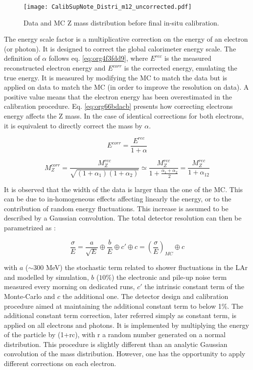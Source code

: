 \begin{figure}[htbp]
\centering
\texttt{[image: CalibSupNote\_Distri\_m12\_uncorrected.pdf]}
\caption{\label{fig:orgb935e5f}
Data and MC Z mass distribution before final in-situ calibration.}
\end{figure}


The energy scale factor is a multiplicative correction on the energy of an electron (or photon).
It is designed to correct the global calorimeter energy scale.
The definition of \(\alpha\) follows eq. \ref{eq:org4f3fdd9}, where \(E^{rec}\) is the measured reconstructed electron energy and \(E^{corr}\) is the corrected energy, emulating the true energy.
It is measured by modifying the MC to match the data but is applied on data to match the MC (in order to improve the resolution on data).
A positive value means that the electron energy has been overestimated in the calibration procedure.
Eq.  \ref{eq:org66bdacb} presents how correcting electrons energy affects the Z mass.
In the case of identical corrections for both electrons, it is equivalent to directly correct the mass by \(\alpha\).

\begin{equation}
\label{eq:org4f3fdd9}
E^{corr}=\frac{E^{rec}}{1+\alpha}
\end{equation}

\begin{equation}
\label{eq:org66bdacb}
M_Z^{corr} =  \frac{M_Z^{rec}}{\sqrt{(1+\alpha_1)(1+\alpha_2)}} \simeq \frac{M_Z^{rec}}{1+\frac{\alpha_1+\alpha_2}{2}} = \frac{M_Z^{rec}}{1+\alpha_{12}}
\end{equation}


It is observed that the width of the data is larger than the one of the MC.
This can be due to in-homogeneous effects affecting linearly the energy, or to the contribution of random energy fluctuations.
This increase is assumed to be described by a Gaussian convolution.
The total detector resolution can then be parametrized as :

\begin{equation}
\label{eq:orgba2e3cd}
  \frac{\sigma}{E} = \frac{a}{\sqrt{E}} \oplus \frac{b}{E} \oplus c' \oplus c = \left(\frac{\sigma}{E}\right)_{MC} \oplus c
\end{equation}

with $a$ ($\sim300$ MeV) the stochastic term related to shower fluctuations in the LAr and modelled by simulation, $b$ ($10\%$) the electronic and pile-up noise term measured every morning on dedicated runs, $c'$ the intrinsic constant term of the Monte-Carlo and $c$ the additional one.
The detector design and calibration procedure aimed at maintaining the additional constant term to below 1\%.
The additional constant term correction, later referred simply as constant term, is applied on all electrons and photons.
It is implemented by multiplying the energy of the particle by (1+rc), with r a random number generated on a normal distribution.
This procedure is slightly different than an analytic Gaussian convolution of the mass distribution.
However, one has the opportunity to apply different corrections  on each electron.

